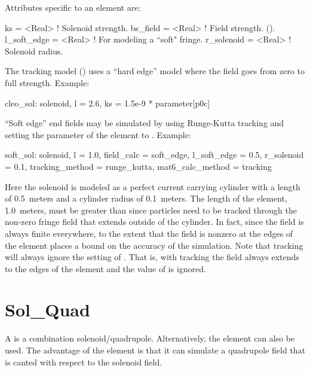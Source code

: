 {
Attributes specific to an  element are:
\begin{example}
  ks          = <Real>   ! Solenoid strength.
  bs_field    = <Real>   ! Field strength. ().
  l_soft_edge = <Real>   ! For modeling a ``soft" fringe.
  r_solenoid  = <Real>   ! Solenoid radius.
\end{example}

The  tracking model () uses a ``hard edge'' model where the field
goes from zero to full strength. 
Example:
\begin{example}
  cleo_sol: solenoid, l = 2.6, ks = 1.5e-9 * parameter[p0c]
\end{example}

``Soft edge'' end fields may be simulated by using Runge-Kutta tracking and setting the 
parameter of the element to . Example:
\begin{example}
  soft_sol: solenoid, l = 1.0, field_calc = soft_edge, l_soft_edge = 0.5, 
              r_solenoid = 0.1, tracking_method = runge_kutta, mat6_calc_method = tracking
\end{example}
Here the solenoid is modeled as a perfect current carrying cylinder with a length of 0.5~meters and
a cylinder radius of 0.1~meters. The length of the element, 1.0~meters, must be greater than
 since particles need to be tracked through the non-zero fringe field that extends
outside of the cylinder. In fact, since the field is always finite everywhere, to the extent that
the field is nonzero at the edges of the element places a bound on the accuracy of the simulation.
Note that  tracking will always ignore the setting of . That is,
with  tracking the field always extends to the edges of the element and the value
of  is ignored.

\section{Sol_Quad}
\label{s:sq}

A  is a combination solenoid/quadrupole. Alternatively, the  element
can also be used. The advantage of the  element is that it can simulate a
quadrupole field that is canted with respect to the solenoid field.

}
